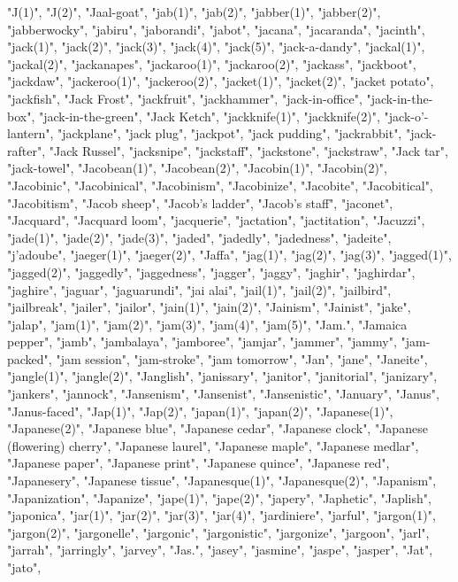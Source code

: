 "J(1)",
"J(2)",
"Jaal-goat",
"jab(1)",
"jab(2)",
"jabber(1)",
"jabber(2)",
"jabberwocky",
"jabiru",
"jaborandi",
"jabot",
"jacana",
"jacaranda",
"jacinth",
"jack(1)",
"jack(2)",
"jack(3)",
"jack(4)",
"jack(5)",
"jack-a-dandy",
"jackal(1)",
"jackal(2)",
"jackanapes",
"jackaroo(1)",
"jackaroo(2)",
"jackass",
"jackboot",
"jackdaw",
"jackeroo(1)",
"jackeroo(2)",
"jacket(1)",
"jacket(2)",
"jacket potato",
"jackfish",
"Jack Frost",
"jackfruit",
"jackhammer",
"jack-in-office",
"jack-in-the-box",
"jack-in-the-green",
"Jack Ketch",
"jackknife(1)",
"jackknife(2)",
"jack-o'-lantern",
"jackplane",
"jack plug",
"jackpot",
"jack pudding",
"jackrabbit",
"jack-rafter",
"Jack Russel",
"jacksnipe",
"jackstaff",
"jackstone",
"jackstraw",
"Jack tar",
"jack-towel",
"Jacobean(1)",
"Jacobean(2)",
"Jacobin(1)",
"Jacobin(2)",
"Jacobinic",
"Jacobinical",
"Jacobinism",
"Jacobinize",
"Jacobite",
"Jacobitical",
"Jacobitism",
"Jacob sheep",
"Jacob's ladder",
"Jacob's staff",
"jaconet",
"Jacquard",
"Jacquard loom",
"jacquerie",
"jactation",
"jactitation",
"Jacuzzi",
"jade(1)",
"jade(2)",
"jade(3)",
"jaded",
"jadedly",
"jadedness",
"jadeite",
"j'adoube",
"jaeger(1)",
"jaeger(2)",
"Jaffa",
"jag(1)",
"jag(2)",
"jag(3)",
"jagged(1)",
"jagged(2)",
"jaggedly",
"jaggedness",
"jagger",
"jaggy",
"jaghir",
"jaghirdar",
"jaghire",
"jaguar",
"jaguarundi",
"jai alai",
"jail(1)",
"jail(2)",
"jailbird",
"jailbreak",
"jailer",
"jailor",
"jain(1)",
"jain(2)",
"Jainism",
"Jainist",
"jake",
"jalap",
"jam(1)",
"jam(2)",
"jam(3)",
"jam(4)",
"jam(5)",
"Jam.",
"Jamaica pepper",
"jamb",
"jambalaya",
"jamboree",
"jamjar",
"jammer",
"jammy",
"jam-packed",
"jam session",
"jam-stroke",
"jam tomorrow",
"Jan",
"jane",
"Janeite",
"jangle(1)",
"jangle(2)",
"Janglish",
"janissary",
"janitor",
"janitorial",
"janizary",
"jankers",
"jannock",
"Jansenism",
"Jansenist",
"Jansenistic",
"January",
"Janus",
"Janus-faced",
"Jap(1)",
"Jap(2)",
"japan(1)",
"japan(2)",
"Japanese(1)",
"Japanese(2)",
"Japanese blue",
"Japanese cedar",
"Japanese clock",
"Japanese (flowering) cherry",
"Japanese laurel",
"Japanese maple",
"Japanese medlar",
"Japanese paper",
"Japanese print",
"Japanese quince",
"Japanese red",
"Japanesery",
"Japanese tissue",
"Japanesque(1)",
"Japanesque(2)",
"Japanism",
"Japanization",
"Japanize",
"jape(1)",
"jape(2)",
"japery",
"Japhetic",
"Japlish",
"japonica",
"jar(1)",
"jar(2)",
"jar(3)",
"jar(4)",
"jardiniere",
"jarful",
"jargon(1)",
"jargon(2)",
"jargonelle",
"jargonic",
"jargonistic",
"jargonize",
"jargoon",
"jarl",
"jarrah",
"jarringly",
"jarvey",
"Jas.",
"jasey",
"jasmine",
"jaspe",
"jasper",
"Jat",
"jato",
